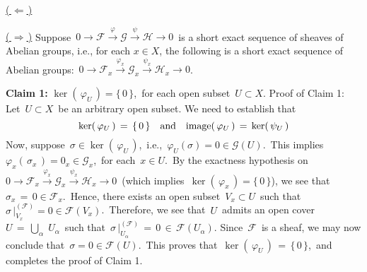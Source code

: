 \vskip 0.3cm
\noindent
\underline{(\,$\Longleftarrow$\,)}\quad


\vskip 0.5cm
\noindent
\underline{(\,$\Longrightarrow$\,)}\quad
Suppose
\,$0 \longrightarrow \mathscr{F} \overset{\varphi}{\longrightarrow} \mathscr{G} \overset{\psi}{\longrightarrow} \mathscr{H} \longrightarrow 0$\,
is a short exact sequence of sheaves of Abelian groups, i.e.,
for each $x \in X$, the following is a short exact sequence of Abelian groups:
\,$0 \longrightarrow \mathscr{F}_{x} \overset{\varphi_{x}}{\longrightarrow} \mathscr{G}_{x} \overset{\psi_{x}}{\longrightarrow} \mathscr{H}_{x} \longrightarrow 0$.\,


\vskip 0.5cm
\noindent
\textbf{Claim 1:}\; $\ker(\,\varphi_{U}\,) = \{\,0\,\}$,\, for each open subset \,$U \subset X$.
\vskip 0.2cm
\noindent
Proof of Claim 1:\;
Let \,$U \subset X$\, be an arbitrary open subset.
We need to establish that
\begin{equation*}
\ker\!\left(\,\varphi_{U}\,\right) \,=\, \{\,0\,\}
\quad\textnormal{and}\quad
\textnormal{image}\!\left(\,\varphi_{U}\,\right) \,=\, \ker\!\left(\,\psi_{U}\,\right)
\end{equation*}
Now, suppose \,$\sigma \in \ker\!\left(\,\varphi_{U}\,\right)$,\, i.e.,
\,$\varphi_{U}(\sigma) = 0 \in \mathscr{G}(U)$.\,
This implies
\,$\varphi_{x}(\,\sigma_{x}\,) = 0_{x} \in \mathscr{G}_{x}$,\,
for each \,$x \in U$.\,
By the exactness hypothesis on
\,$0 \longrightarrow \mathscr{F}_{x} \overset{\varphi_{x}}{\longrightarrow} \mathscr{G}_{x} \overset{\psi_{x}}{\longrightarrow} \mathscr{H}_{x} \longrightarrow 0$\,
(which implies \,$\ker(\,\varphi_{x}\,) = \{\,0\,\}$), we see that \,$\sigma_{x} \,=\, 0 \in \mathscr{F}_{x}$.\,
Hence, there exists an open subset \,$V_{x} \subset U$\, such that \,$\sigma\,\vert^{(\mathscr{F})}_{V_{x}} = 0 \in \mathscr{F}(V_{x})$.\,
Therefore, we see that \,$U$\, admits an open cover \,$U \,=\, \underset{\alpha}{\bigcup}\;U_{\alpha}$\,
such that \,$\sigma\,\vert^{(\mathscr{F})}_{U_{\alpha}} \,=\, 0 \,\in\, \mathscr{F}(U_{\alpha})$.
{\color{red}Since \,$\mathscr{F}$\, is a sheaf}, we may now conclude that
\,$\sigma = 0 \in \mathscr{F}(U)$.\,
This proves that \,$\ker(\,\varphi_{U}\,) \,=\, \{\,0\,\}$,\, and completes the proof of Claim 1.



